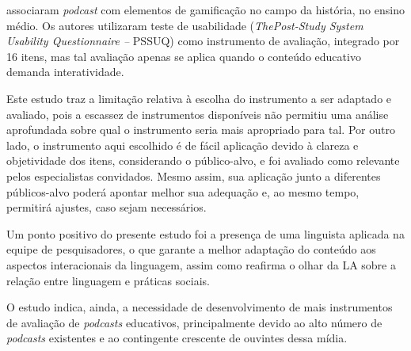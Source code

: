 \textcite{biabdillah2021} associaram \textit{podcast} com elementos de
gamificação no campo da história, no ensino médio. Os autores utilizaram teste
de usabilidade (\textit{ThePost-Study System Usability Questionnaire – }PSSUQ)
como instrumento de avaliação, integrado por 16 itens, mas tal avaliação apenas
se aplica quando o conteúdo educativo demanda interatividade.

Este estudo traz a limitação relativa à escolha do instrumento a ser adaptado e
avaliado, pois a escassez de instrumentos disponíveis não permitiu uma análise
aprofundada sobre qual o instrumento seria mais apropriado para tal. Por outro
lado, o instrumento aqui escolhido é de fácil aplicação devido à clareza e
objetividade dos itens, considerando o público-alvo, e foi avaliado como
relevante pelos especialistas convidados. Mesmo assim, sua aplicação junto a
diferentes públicos-alvo poderá apontar melhor sua adequação e, ao mesmo tempo,
permitirá ajustes, caso sejam necessários.

Um ponto positivo do presente estudo foi a presença de uma linguista aplicada
na equipe de pesquisadores, o que garante a melhor adaptação do conteúdo aos
aspectos interacionais da linguagem, assim como reafirma o olhar da LA sobre a
relação entre linguagem e práticas sociais.

O estudo indica, ainda, a necessidade de desenvolvimento de mais instrumentos
de avaliação de \textit{podcasts} educativos, principalmente devido ao alto
número de \textit{podcasts} existentes e ao contingente crescente de ouvintes
dessa mídia.
